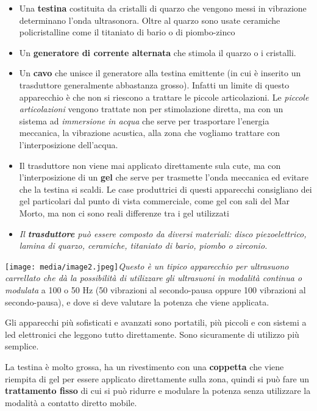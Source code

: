 \documentclass[]{article}
\begin{document}
\begin{itemize}
\item
  Una \textbf{testina} costituita da cristalli di quarzo che vengono
  messi in vibrazione determinano l'onda ultrasonora. Oltre al quarzo
  sono usate ceramiche policristalline come il titaniato di bario o di
  piombo-zinco
\item
  Un \textbf{generatore di corrente alternata} che stimola il quarzo o i
  cristalli.
\item
  Un \textbf{cavo} che unisce il generatore alla testina emittente (in
  cui è inserito un trasduttore generalmente abbastanza grosso). Infatti
  un limite di questo apparecchio è che non si riescono a trattare le
  piccole articolazioni. Le \emph{piccole articolazioni} vengono
  trattate non per stimolazione diretta, ma con un sistema ad
  \emph{immersione in acqua} che serve per trasportare l'energia
  meccanica, la vibrazione acustica, alla zona che vogliamo trattare con
  l'interposizione dell'acqua.
\item
  Il trasduttore non viene mai applicato direttamente sula cute, ma con
  l'interposizione di un \textbf{gel} che serve per trasmette l'onda
  meccanica ed evitare che la testina si scaldi. Le case produttrici di
  questi apparecchi consigliano dei gel particolari dal punto di vista
  commerciale, come gel con sali del Mar Morto, ma non ci sono reali
  differenze tra i gel utilizzati
\item
  \emph{Il \textbf{trasduttore} può essere composto da diversi
  materiali: disco piezoelettrico, lamina di quarzo, ceramiche,
  titaniato di bario, piombo o zirconio.}
\end{itemize}

\texttt{[image: media/image2.jpeg]}\emph{Questo
è un tipico apparecchio per ultrasuono carrellato che dà la possibilità
di utilizzare gli ultrasuoni in modalità continua o modulata} a 100 o 50
Hz (50 vibrazioni al secondo-pausa oppure 100 vibrazioni al
secondo-pausa), e dove si deve valutare la potenza che viene applicata.

Gli apparecchi più sofisticati e avanzati sono portatili, più piccoli e
con sistemi a led elettronici che leggono tutto direttamente. Sono
sicuramente di utilizzo più semplice.

La testina è molto grossa, ha un rivestimento con una \textbf{coppetta}
che viene riempita di gel per essere applicato direttamente sulla zona,
quindi si può fare un \textbf{trattamento fisso} di cui si può ridurre e
modulare la potenza senza utilizzare la modalità a contatto diretto
mobile.
\end{document}
